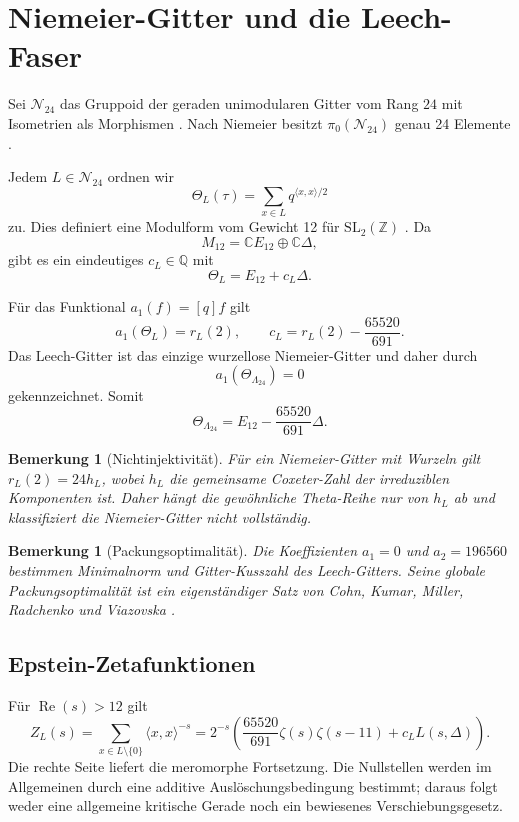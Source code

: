 \documentclass[11pt,a4paper]{article}
\newtheorem{remark}[theorem]{Bemerkung}
\begin{document}
\section{Niemeier-Gitter und die Leech-Faser}
Sei $\mathscr{N}_{24}$ das Gruppoid der geraden unimodularen Gitter vom Rang $24$ mit Isometrien als Morphismen \cite{ebeling}. Nach Niemeier besitzt $\pi_0(\mathscr{N}_{24})$ genau 24 Elemente \cite{niemeier}.

Jedem $L\in\mathscr{N}_{24}$ ordnen wir
\[
\Theta_L(\tau)=\sum_{x\in L}q^{\langle x,x\rangle/2}
\]
zu. Dies definiert eine Modulform vom Gewicht 12 für $\mathrm{SL}_2(\mathbb{Z})$ \cite{serre}. Da
\[
M_{12}=\mathbb{C}E_{12}\oplus\mathbb{C}\Delta,
\]
gibt es ein eindeutiges $c_L\in\mathbb{Q}$ mit
\[
\Theta_L=E_{12}+c_L\Delta.
\]

Für das Funktional $a_1(f)=[q]f$ gilt
\[
a_1(\Theta_L)=r_L(2),\qquad c_L=r_L(2)-\frac{65520}{691}.
\]
Das Leech-Gitter ist das einzige wurzellose Niemeier-Gitter und daher durch
\[
a_1(\Theta_{\Lambda_{24}})=0
\]
gekennzeichnet. Somit
\[
\Theta_{\Lambda_{24}}=E_{12}-\frac{65520}{691}\Delta.
\]

\begin{remark}[Nichtinjektivität]
Für ein Niemeier-Gitter mit Wurzeln gilt $r_L(2)=24h_L$, wobei $h_L$ die gemeinsame Coxeter-Zahl der irreduziblen Komponenten ist. Daher hängt die gewöhnliche Theta-Reihe nur von $h_L$ ab und klassifiziert die Niemeier-Gitter nicht vollständig.
\end{remark}

\begin{remark}[Packungsoptimalität]
Die Koeffizienten $a_1=0$ und $a_2=196560$ bestimmen Minimalnorm und Gitter-Kusszahl des Leech-Gitters. Seine globale Packungsoptimalität ist ein eigenständiger Satz von Cohn, Kumar, Miller, Radchenko und Viazovska \cite{cohn}.
\end{remark}

\subsection{Epstein-Zetafunktionen}
Für $\operatorname{Re}(s)>12$ gilt
\[
Z_L(s)=\sum_{x\in L\setminus\{0\}}\langle x,x\rangle^{-s}
=2^{-s}\left(\frac{65520}{691}\zeta(s)\zeta(s-11)+c_LL(s,\Delta)\right).
\]
Die rechte Seite liefert die meromorphe Fortsetzung. Die Nullstellen werden im Allgemeinen durch eine additive Auslöschungsbedingung bestimmt; daraus folgt weder eine allgemeine kritische Gerade noch ein bewiesenes Verschiebungsgesetz.
\end{document}
